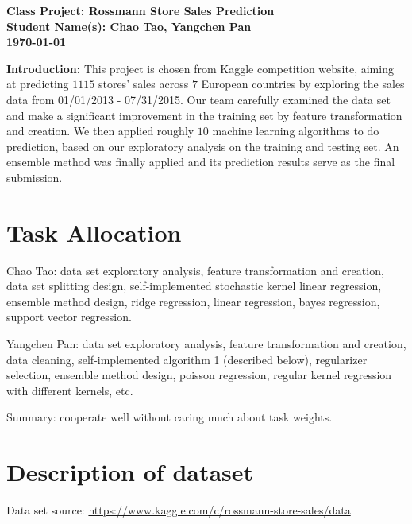 \documentclass[11pt]{article}
\begin{document}
\thispagestyle{plain}

\begin{center}
\bfseries
{\Large Class Project: Rossmann Store Sales Prediction}\\
   Student Name(s): Chao Tao, Yangchen Pan\\
   \today
\end{center}

\textbf{Introduction:} This project is chosen from Kaggle competition website, aiming at predicting $1115$ stores' sales across $7$ European countries by exploring the sales data from 01/01/2013 - 07/31/2015. Our team carefully examined the data set and make a significant improvement in the training set by feature transformation and creation. We then applied roughly $10$ machine learning algorithms to do prediction, based on our exploratory analysis on the training and testing set. An ensemble method was finally applied and its prediction results serve as the final submission. 

\section{Task Allocation}
Chao Tao: data set exploratory analysis, feature transformation and creation, data set splitting design, self-implemented stochastic kernel linear regression, ensemble method design, ridge regression, linear regression, bayes regression, support vector regression.   

Yangchen Pan: data set exploratory analysis, feature transformation and creation, data cleaning, self-implemented algorithm 1 (described below), regularizer selection, ensemble method design, poisson regression, regular kernel regression with different kernels, etc.

Summary: cooperate well without caring much about task weights.   
\section{Description of dataset}

Data set source: \hyperref[Rossmann Store Sales]{https://www.kaggle.com/c/rossmann-store-sales/data}
\\
\end{document}
